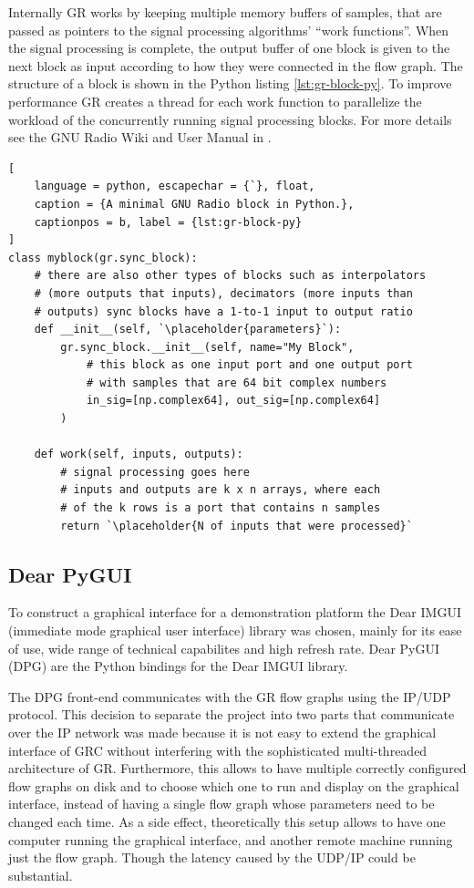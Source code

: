 Internally GR works by keeping multiple memory buffers of samples, that are passed as pointers to the signal processing algorithms' ``work functions''. When the signal processing is complete, the output buffer of one block is given to the next block as input according to how they were connected in the flow graph. The structure of a block is shown in the Python listing \ref{lst:gr-block-py}. To improve performance GR creates a thread for each work function to parallelize the workload of the concurrently running signal processing blocks. For more details see the GNU Radio Wiki and User Manual in \cite{GRWiki}.

{\newcommand{\placeholder}[1]{\textit{\(\langle\)\,\textrm{#1}\,\(\rangle\)}}
\begin{lstlisting}[
	language = python, escapechar = {`}, float,
	caption = {A minimal GNU Radio block in Python.},
	captionpos = b, label = {lst:gr-block-py}
]
class myblock(gr.sync_block):
	# there are also other types of blocks such as interpolators 
	# (more outputs that inputs), decimators (more inputs than 
	# outputs) sync blocks have a 1-to-1 input to output ratio
	def __init__(self, `\placeholder{parameters}`):
		gr.sync_block.__init__(self, name="My Block",
			# this block as one input port and one output port
			# with samples that are 64 bit complex numbers
			in_sig=[np.complex64], out_sig=[np.complex64]
		)

	def work(self, inputs, outputs):
		# signal processing goes here
		# inputs and outputs are k x n arrays, where each
		# of the k rows is a port that contains n samples
		return `\placeholder{N of inputs that were processed}`
\end{lstlisting}}

\subsection{Dear PyGUI}\label{sec:GUI}

To construct a graphical interface for a demonstration platform the Dear IMGUI (immediate mode graphical user interface) library was chosen, mainly for its ease of use, wide range of technical capabilites and high refresh rate. Dear PyGUI (DPG) are the Python bindings for the Dear IMGUI library.

The DPG front-end communicates with the GR flow graphs using the IP/UDP protocol. This decision to separate the project into two parts that communicate over the IP network was made because it is not easy to extend the graphical interface of GRC without interfering with the sophisticated multi-threaded architecture of GR. Furthermore, this allows to have multiple correctly configured flow graphs on disk and to choose which one to run and display on the graphical interface, instead of having a single flow graph whose parameters need to be changed each time. As a side effect, theoretically this setup allows to have one computer running the graphical interface, and another remote machine running just the flow graph. Though the latency caused by the UDP/IP could be substantial.

